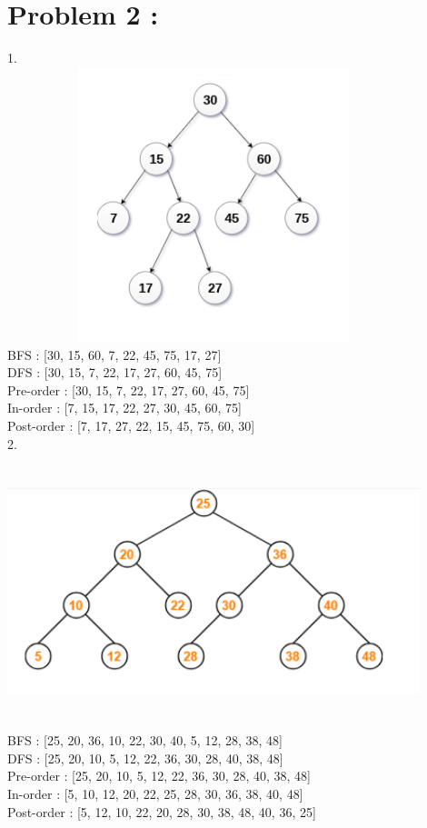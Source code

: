 \documentclass{report}
\begin{document}
    \section* {Problem 2 :}
    1.\\
    \includegraphics[height = 80mm,width = 120mm]{2_1.png}\\
    \Large BFS : [30, 15, 60, 7, 22, 45, 75, 17, 27]\\
    DFS : [30, 15, 7, 22, 17, 27, 60, 45, 75]\\
    Pre-order : [30, 15, 7, 22, 17, 27, 60, 45, 75]\\
    In-order : [7, 15, 17, 22, 27, 30, 45, 60, 75]\\
    Post-order : [7, 17, 27, 22, 15, 45, 75, 60, 30]\\
    \newpage
    \normalsize
    2.\\
    \includegraphics[height = 80mm,width = 120mm]{2_2.png}\\
    \Large BFS : [25, 20, 36, 10, 22, 30, 40, 5, 12, 28, 38, 48]\\
    DFS : [25, 20, 10, 5, 12, 22, 36, 30, 28, 40, 38, 48]\\
    Pre-order : [25, 20, 10, 5, 12, 22, 36, 30, 28, 40, 38, 48]\\
    In-order : [5, 10, 12, 20, 22, 25, 28, 30, 36, 38, 40, 48]\\
    Post-order : [5, 12, 10, 22, 20, 28, 30, 38, 48, 40, 36, 25]\\
\end{document}
